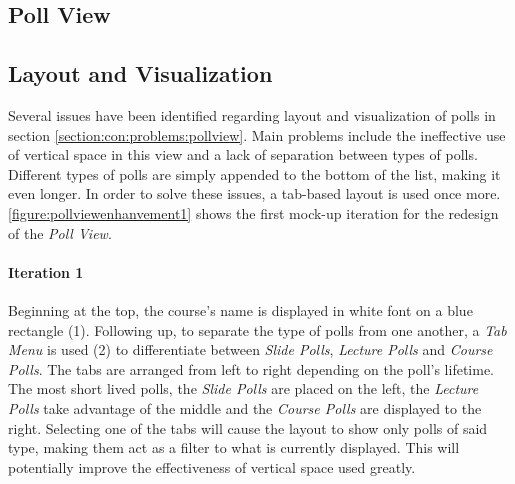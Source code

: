 \subsection{Poll View}

\subsection{Layout and Visualization}
Several issues have been identified regarding layout and visualization of polls in section \autoref{section:con:problems:pollview}. Main problems include the ineffective use of vertical space in this view and a lack of separation between types of polls. Different types of polls are simply appended to the bottom of the list, making it even longer.
In order to solve these issues, a tab-based layout is used once more. 
 \autoref{figure:pollviewenhanvement1} shows the first mock-up iteration for the redesign of the \emph{Poll View}.
\paragraph{Iteration 1}
Beginning at the top, the course's name is displayed in white font on a blue rectangle (1). Following up, to separate the type of polls from one another, a \emph{Tab Menu} is used (2) to differentiate between \emph{Slide Polls}, \emph{Lecture Polls} and \emph{Course Polls}. The tabs are arranged from left to right depending on the poll's lifetime. The most short lived polls, the \emph{Slide Polls} are placed on the left, the \emph{Lecture Polls} take advantage of the middle and the \emph{Course Polls} are displayed to the right. Selecting one of the tabs will cause the layout to show only polls of said type, making them act as a filter to what is currently displayed. This will potentially improve the effectiveness of vertical space used greatly. 

